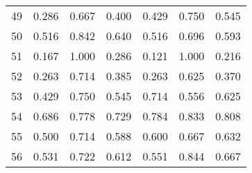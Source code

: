 \begin{table}[H]
\begin{tabular}{lcccccc}
    49 & 0.286 & 0.667 & 0.400 & 0.429 & 0.750 & 0.545 \\
    50 & 0.516 & 0.842 & 0.640 & 0.516 & 0.696 & 0.593 \\
    51 & 0.167 & 1.000 & 0.286 & 0.121 & 1.000 & 0.216 \\
    52 & 0.263 & 0.714 & 0.385 & 0.263 & 0.625 & 0.370 \\
    53 & 0.429 & 0.750 & 0.545 & 0.714 & 0.556 & 0.625 \\
    54 & 0.686 & 0.778 & 0.729 & 0.784 & 0.833 & 0.808 \\
    55 & 0.500 & 0.714 & 0.588 & 0.600 & 0.667 & 0.632 \\
    56 & 0.531 & 0.722 & 0.612 & 0.551 & 0.844 & 0.667 \\
\hline
\end{tabular}
\end{table}